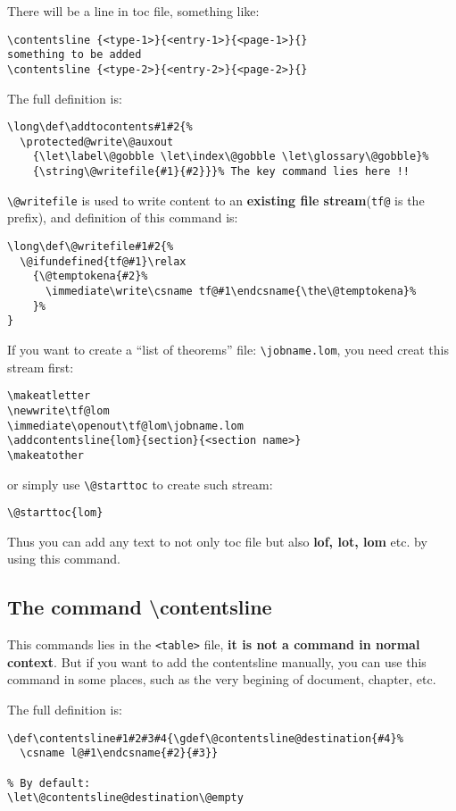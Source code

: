 \documentclass{article}
\begin{document}
There will be a line in toc file, something like:
\begin{lstlisting}
\contentsline {<type-1>}{<entry-1>}{<page-1>}{}
something to be added
\contentsline {<type-2>}{<entry-2>}{<page-2>}{}
\end{lstlisting}

The full definition is:
\begin{lstlisting}
\long\def\addtocontents#1#2{%
  \protected@write\@auxout
    {\let\label\@gobble \let\index\@gobble \let\glossary\@gobble}%
    {\string\@writefile{#1}{#2}}}% The key command lies here !!
\end{lstlisting}

\verb|\@writefile| is used to write content to an \textbf{existing file stream}(\verb|tf@| is the prefix), and 
definition of this command is:
\begin{lstlisting}
\long\def\@writefile#1#2{%
  \@ifundefined{tf@#1}\relax
    {\@temptokena{#2}%
      \immediate\write\csname tf@#1\endcsname{\the\@temptokena}%
    }%
}
\end{lstlisting}

If you want to create a ``list of theorems'' file: \verb|\jobname.lom|, you need creat this stream first:
\begin{lstlisting}
\makeatletter
\newwrite\tf@lom
\immediate\openout\tf@lom\jobname.lom
\addcontentsline{lom}{section}{<section name>}
\makeatother
\end{lstlisting}

or simply use \verb|\@starttoc| to create such stream:
\begin{lstlisting}
\@starttoc{lom}
\end{lstlisting}

Thus you can add any text to not only toc file but also \textbf{lof, lot, lom} etc. by using this command.

\subsection{The command \textbackslash contentsline}
This commands lies in the \verb|<table>| file, \textbf{it is not a command in normal context}. But if you want to add the 
contentsline manually, you can use this command in some places, such as the very begining of document, chapter, etc. 

The full definition is:
\begin{lstlisting}
\def\contentsline#1#2#3#4{\gdef\@contentsline@destination{#4}%
  \csname l@#1\endcsname{#2}{#3}}

% By default:
\let\@contentsline@destination\@empty
\end{lstlisting}
\end{document}
